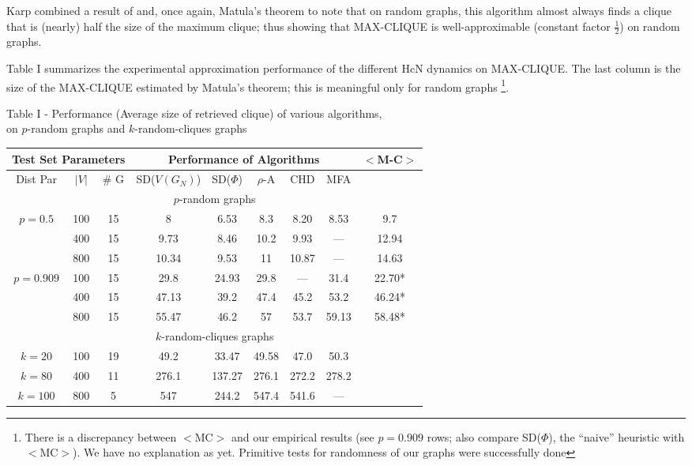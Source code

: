 Karp \cite{kn:Kar76} combined a result of \cite{kn:GrM75} and, once again,
Matula's theorem to note 
that on random graphs, this algorithm almost always finds a clique
that is (nearly) half the size of the maximum clique; thus showing
that MAX-CLIQUE is well-approximable (constant factor $\frac{1}{2}$)
on random graphs. 
\par
Table I summarizes the experimental approximation
performance of the different HcN dynamics on MAX-CLIQUE. 
The last column is the size of the 
MAX-CLIQUE estimated by Matula's theorem; this is meaningful only for 
random graphs 
\footnote{There is a discrepancy between
$<$MC$>$ and our empirical results (see $p=0.909$ rows; also 
compare SD($\Phi$), the ``naive'' heuristic with $<$MC$>$).
We have no explanation as yet. Primitive tests for randomness of
our graphs were successfully done}.
{\small
\begin{center}
Table I -
Performance (Average size of retrieved clique) of various algorithms, \\
on $p$-random graphs and $k$-random-cliques graphs
\end{center}
\begin{center}
\begin{tabular}{ccc|ccccc|c}
\multicolumn{3}{c|}{Test Set Parameters} &
\multicolumn{5}{c|}{Performance of Algorithms} & $<$M-C$>$ \\ \hline
Dist Par & $|V|$& \# G & SD($V(G_N)$) & SD($\Phi$) & $\rho$-A & CHD & MFA 
\\ \hline
\multicolumn{9}{c}{$p$-random graphs} \\ \hline 
$p=0.5$    & 100 & 15   & 8      &   6.53   &  8.3     & 8.20& 8.53& 9.7 \\ 
           & 400 & 15   & 9.73   &   8.46   &  10.2    & 9.93& --- & 12.94 \\ 
           & 800 & 15   & 10.34  &   9.53   &  11      &10.87& --- & 14.63 \\ \hline 
$p=0.909$  & 100 & 15   & 29.8   &  24.93   &  29.8    & --- &31.4 & 22.70* \\ 
           & 400 & 15   & 47.13  &  39.2    &  47.4    & 45.2&53.2 & 46.24* \\ 
           & 800 & 15   & 55.47  &  46.2    &  57      &53.7 &59.13& 58.48* \\ \hline 
\multicolumn{9}{c}{$k$-random-cliques graphs} \\ \hline 
$k=20$        &100  & 19   & 49.2   &  33.47   &   49.58  &47.0 &50.3 & \\ 
$k=80$        &400  & 11   & 276.1  &  137.27  &  276.1   &272.2&278.2& \\ 
$k=100$       &800  & 5    & 547    &  244.2   &   547.4  &541.6&---\\ \hline 
\end{tabular}
\end{center}
}
